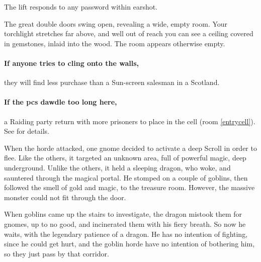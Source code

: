 \begin{multicols}{2}
The lift responds to any password within earshot.

\begin{boxtext}
  The great double doors swing open, revealing a wide, empty room.
  Your torchlight stretches far above, and well out of reach you can see a ceiling covered in gemstones, inlaid into the wood.
  The room appears otherwise empty.
\end{boxtext}

\paragraph{If anyone tries to cling onto the walls,}
they will find less purchase than a Sun-screen salesman in a Scotland.

\paragraph{If the \glspl{pc} dawdle too long here,}
a Raiding party return with more prisoners to place in the cell (room \ref{entrycell}).
See  for details.



\begin{exampletext}
  When the horde attacked, one gnome decided to activate a \Gls{deep} Scroll in order to flee.
  Like the others, it targeted an unknown area, full of powerful magic, deep underground.
  Unlike the others, it held a sleeping dragon, who woke, and sauntered through the magical portal.
  He stomped on a couple of goblins, then followed the smell of gold and magic, to the treasure room.
  However, the massive monster could not fit through the door.

  When goblins came up the stairs to investigate, the dragon mistook them for gnomes, up to no good, and incinerated them with his fiery breath.
  So now he waits, with the legendary patience of a dragon.
  He has no intention of fighting, since he could get hurt, and the goblin horde have no intention of bothering him, so they just pass by that corridor.


\end{exampletext}
\end{multicols}
